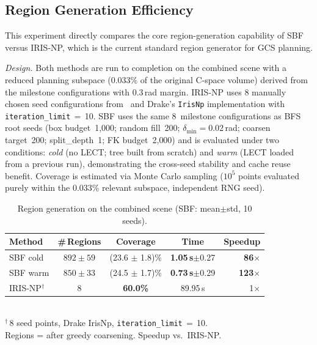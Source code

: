 \documentclass[letterpaper, conference]{IEEEtran}
\begin{document}
\subsection{Region Generation Efficiency}\label{sec:exp1}

This experiment directly compares the core region-generation capability of
SBF versus IRIS-NP, which is the current standard region generator for GCS
planning.

\emph{Design.}
Both methods are run to completion on the combined scene with a
reduced planning subspace (0.033\% of the original C-space volume)
derived from the milestone configurations with 0.3\,rad margin.
IRIS-NP uses 8 manually chosen seed configurations
from~\cite{marcucci2024motion} and Drake's \texttt{IrisNp}
implementation with \texttt{iteration\_limit}$\,{=}\,$10.
SBF uses the same 8~milestone configurations as BFS root seeds
(box budget~1{,}000; random fill~200; $\delta_{\min}{=}0.02$\,rad;
coarsen target~200; split\_depth~1; FK budget~2{,}000)
and is evaluated under two conditions:
\emph{cold} (no LECT; tree built from scratch) and
\emph{warm} (LECT loaded from a previous run),
demonstrating the cross-seed stability and cache reuse benefit.
Coverage is estimated via Monte Carlo sampling
($10^5$ points evaluated purely within the 0.033\% relevant subspace, independent RNG seed).

\begin{table}[t]
\centering
\caption{Region generation on the combined scene (SBF: mean$\pm$std, 10 seeds).}
\label{tab:exp1}
\footnotesize
\begin{tabular}{@{}lcccr@{}}
\toprule
Method & \#\,Regions & Coverage & Time & Speedup \\
\midrule
SBF cold  & $892{\pm}59$ & (23.6 $\pm$ 1.8)\% & \textbf{1.05\,s}${\pm}$0.27 & \textbf{86$\times$} \\
SBF warm  & $850{\pm}33$ & (24.5 $\pm$ 1.7)\% & \textbf{0.73\,s}${\pm}$0.29 & \textbf{123$\times$} \\
\midrule
IRIS-NP$^\dagger$ & 8 & \textbf{60.0\%} & 89.95\,s & 1$\times$ \\
\bottomrule
\end{tabular}
\\[2pt]
{\scriptsize $^\dagger$\,8 seed points, Drake IrisNp, \texttt{iteration\_limit}$\,{=}\,$10.\\
Regions = after greedy coarsening.  Speedup vs.\ IRIS-NP.}
\end{table}
\end{document}
